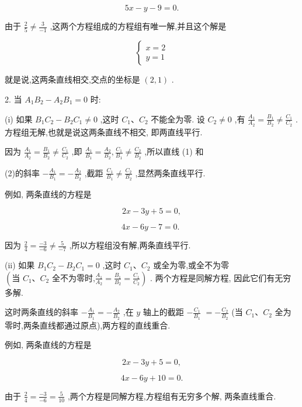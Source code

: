 \documentclass[lang=cn,newtx,10.5pt,scheme=chinese]{elegantbook}
\begin{document}
\[
    {5x} - y - 9 = 0.
\]

由于 \(\frac{2}{5} \neq \frac{3}{-1}\) ,这两个方程组成的方程组有唯一解,并且这个解是

\[
  \left\{ \begin{array}{l} x = 2 \\ y = 1 \end{array}\right.
\]

就是说,这两条直线相交,交点的坐标是 \(\left( {2,1}\right)\) .

2. 当 \({A}_{1}{B}_{2} - {A}_{2}{B}_{1} = 0\) 时:

(i) 如果 \({B}_{1}{C}_{2} - {B}_{2}{C}_{1} \neq 0\) ,这时 \({C}_{1}\text{、}{C}_{2}\) 不能全为零. 设 \({C}_{2} \neq 0\) ,有 \(\frac{{A}_{1}}{{A}_{2}} = \frac{{B}_{1}}{{B}_{2}} \neq \frac{{C}_{1}}{{C}_{2}}\) . 方程组无解,也就是说这两条直线不相交, 即两直线平行.

因为 \(\frac{{A}_{1}}{{A}_{2}} = \frac{{B}_{1}}{{B}_{2}} \neq \frac{{C}_{1}}{{C}_{2}}\) ,即 \(\frac{{A}_{1}}{{B}_{1}} = \frac{{A}_{2}}{{B}_{2}},\frac{{C}_{1}}{{B}_{1}} \neq \frac{{C}_{2}}{{B}_{2}}\) ,所以直线 (1) 和

(2)的斜率 \(- \frac{{A}_{1}}{{B}_{1}} = - \frac{{A}_{2}}{{B}_{2}}\) ,截距 \(\frac{{C}_{1}}{{B}_{1}} \neq \frac{{C}_{2}}{{B}_{2}}\) ,显然两条直线平行.

例如, 两条直线的方程是

\[
    {2x} - {3y} + 5 = 0,
\]

\[
    {4x} - {6y} - 7 = 0\text{. }
\]

因为 \(\frac{2}{4} = \frac{-3}{-6} \neq \frac{5}{-7}\) ,所以方程组没有解,两条直线平行.

(ii) 如果 \({B}_{1}{C}_{2} - {B}_{2}{C}_{1} = 0\) ,这时 \({C}_{1}\text{、}{C}_{2}\) 或全为零,或全不为零 \(\left( {\text{当 }{C}_{1}\text{、}{C}_{2}\text{ 全不为零时,}\frac{{A}_{1}}{{A}_{2}} = \frac{{B}_{1}}{{B}_{2}} = \frac{{C}_{1}}{{C}_{2}}}\right)\) . 两个方程是同解方程, 因此它们有无穷多解.

这时两条直线的斜率 \(- \frac{{A}_{1}}{{B}_{1}} = - \frac{{A}_{2}}{{B}_{2}}\) ,在 \(y\) 轴上的截距 \(- \frac{{C}_{1}}{{B}_{1}}\) \(= - \frac{{C}_{2}}{{B}_{2}}\) (当 \({C}_{1}\text{、}{C}_{2}\) 全为零时,两条直线都通过原点),两方程的直线重合.

例如, 两条直线的方程是

\[
    {2x} - {3y} + 5 = 0,
\]

\[
    {4x} - {6y} + {10} = 0.
\]

由于 \(\frac{2}{4} = \frac{-3}{-6} = \frac{5}{10}\) ,两个方程是同解方程,方程组有无穷多个解, 两条直线重合.
\end{document}
